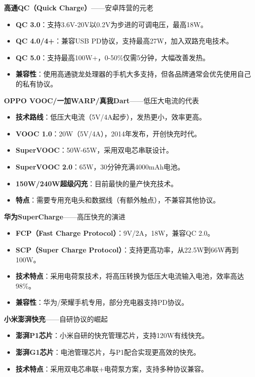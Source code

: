 \textbf{高通QC（Quick Charge）}——安卓阵营的元老

\begin{itemize}
  \item \textbf{QC 3.0}：支持3.6V-20V以0.2V为步进的可调电压，最高18W。
  \item \textbf{QC 4.0/4+}：兼容USB PD协议，支持最高27W，加入双路充电技术。
  \item \textbf{QC 5.0}：支持最高100W+，0-50\%仅需5分钟，大幅改善发热。
  \item \textbf{兼容性}：使用高通骁龙处理器的手机大多支持，但各品牌通常会优先使用自己的私有协议。
\end{itemize}

\textbf{OPPO VOOC/一加WARP/真我Dart}——低压大电流的代表

\begin{itemize}
  \item \textbf{技术路线}：低压大电流（5V/4A起步），发热更小，效率更高。
  \item \textbf{VOOC 1.0}：20W（5V/4A），2014年发布，开创快充时代。
  \item \textbf{SuperVOOC}：50W-65W，采用双电芯串联设计。
  \item \textbf{SuperVOOC 2.0}：65W，30分钟充满4000mAh电池。
  \item \textbf{150W/240W超级闪充}：目前最快的量产快充技术。
  \item \textbf{特点}：需要专用充电头和数据线（有额外触点），不兼容其他协议。
\end{itemize}

\textbf{华为SuperCharge}——高压快充的演进

\begin{itemize}
  \item \textbf{FCP（Fast Charge Protocol）}：9V/2A，18W，兼容QC 2.0。
  \item \textbf{SCP（Super Charge Protocol）}：支持更高功率，从22.5W到66W再到100W。
  \item \textbf{技术特点}：采用电荷泵技术，将高压转换为低压大电流输入电池，效率高达98\%。
  \item \textbf{兼容性}：华为/荣耀手机专用，部分充电器支持PD协议。
\end{itemize}

\textbf{小米澎湃快充}——自研协议的崛起

\begin{itemize}
  \item \textbf{澎湃P1芯片}：小米自研的快充管理芯片，支持120W有线快充。
  \item \textbf{澎湃G1芯片}：电池管理芯片，与P1配合实现更高效的快充。
  \item \textbf{技术特点}：采用双电芯串联+电荷泵方案，支持多种协议兼容。
\end{itemize}

